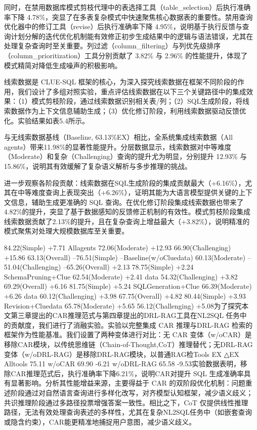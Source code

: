 \documentclass[12pt,a4paper,openright,UTF8]{ctexbook}
\begin{document}
同时，在禁用数据库模式剪枝代理中的表选择工具（table\_selection）后执行准确率下降 4.78\%，突显了在多表复杂模式中快速聚焦核心数据表的重要性。禁用查询优化器中的修订工具（revise）后执行准确率下降 4.95\%，说明基于执行反馈与查询计划分解的迭代优化机制能有效修正初步生成结果中的逻辑与语法错误，尤其在处理复杂查询时至关重要。列过滤（column\_filtering）与列优先级排序（column\_prioritization）工具分别贡献了 3.82\% 与 2.96\% 的性能提升，体现了模式精简对降低生成噪声的积极影响。


线索数据是 CLUE-SQL 框架的核心，为深入探究线索数据在框架不同阶段的作用，我们设计了多组对照实验，重点评估线索数据在以下三个关键路径中的集成效果：（1）模式剪枝阶段，通过线索数据识别相关表/列；（2）SQL生成阶段，将线索数据作为上下文信息辅助生成；（3）优化修订阶段，利用线索数据驱动反馈优化。实验结果如表5.4所示。


与无线索数据基线（Baseline, 63.13\%EX）相比，全系统集成线索数据（All agents）带来11.98\%的显著性能提升。分层数据显示，线索数据对中等难度（Moderate）和复杂（Challenging）查询的提升尤为明显，分别提升 12.93\% 与 15.86\%，说明其有效缓解了复杂语义解析与多步推理的挑战。


进一步观察各阶段贡献：线索数据在SQL生成阶段的集成贡献最大（+6.16\%），尤其在中等难度查询上表现突出（+6.26\%），证明其能为大语言模型提供关键的上下文信息，辅助生成更准确的 SQL 查询。在优化修订阶段集成线索数据也带来了4.82\%的提升，突显了基于数据感知的反馈修正机制的有效性。模式剪枝阶段集成线索数据贡献了2.13\%的提升，且在复杂查询上增益最大（+3.82\%），说明精准的模式聚焦对处理大规模数据库至关重要。


84.22(Simple) +7.71 Allagents 72.06(Moderate) +12.93 66.90(Challenging) +15.86 63.13(Overall) –76.51(Simple) –Baseline(w/oCluedata) 60.13(Moderate) –51.04(Challenging) –65.26(Overall) +2.13 78.75(Simple) +2.24 SchemaPruning+Clue 62.54(Moderate) +2.41 data 54.32(Challenging) +3.82 69.29(Overall) +6.16 81.75(Simple) +5.24 SQLGeneration+Clue 66.39(Moderate) +6.26 data 60.12(Challenging) +3.98 67.75(Overall) +4.82 80.44(Simple) +3.93 Revision+Cluedata 65.78(Moderate) +5.65 56.12(Challenging) +5.08为了探究本文第三章提出的CAR推理范式与第四章提出的DRL-RAG工具在NL2SQL 任务中的贡献度，我们进行了消融实验。实验以完整集成 CAR 推理与DRL-RAG 检索的框架作为性能基准。我们设置了两种变体进行对比：无 CAR 变体（w/oCAR）是移除CAR模块，以传统思维链（Chain-of-Thought,CoT）推理替代；无DRL-RAG变体（w/oDRL-RAG）是移除DRL-RAG模块，以普通RAG检Tools EX △EX Alltools 75.11 w/oCAR 69.90 -6.21 w/oDRL-RAG 65.58 -9.53实验数据表明，移除CAR推理范式后，执行准确率下降6.21\%，说明CAR对提升 SQL 生成准确率具有显著影响。分析其性能增益来源，主要得益于 CAR 的双阶段优化机制：问题重述阶段通过对自然语言查询进行多样化改写，对齐模型认知框架，减少语义歧义；共识推理阶段通过多路径投票增强答案一致性。相比之下，CoT 仅提供线性推理路径，无法有效处理查询表述的多样性，尤其在复杂NL2SQL任务中（如嵌套查询或隐含约束），CAR能更精准地捕捉用户意图，减少语义歧义。
\end{document}
